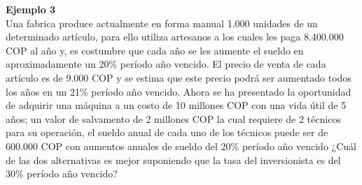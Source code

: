 \textbf{Ejemplo 3}\\
Una fabrica produce actualmente en forma manual 1.000 unidades de un determinado artículo, para ello utiliza artesanos a los cuales les paga 8.400.000 COP al año y, es costumbre que cada año se les aumente el sueldo en aproximadamente un 20\% período año vencido. El precio de venta de cada artículo es de 9.000 COP y se estima que este precio podrá ser aumentado todos los años en un 21\% período año vencido. Ahora se ha presentado la oportunidad de adquirir una máquina a un costo de 10 millones COP con una vida útil de 5 años; un valor de salvamento de 2 millones COP la cual requiere de 2 técnicos para su operación, el sueldo anual de cada uno de los técnicos puede ser de 600.000 COP con aumentos anuales de sueldo del 20\% período año vencido ¿Cuál de las dos alternativas es mejor suponiendo que la tasa del inversionista es del 30\% período año vencido?\\



